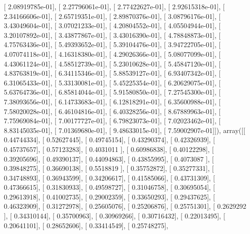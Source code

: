 \documentclass{article}
\begin{document}
       [  2.08919785e-01],
       [  2.27796061e-01],
       [  2.77422627e-01],
       [  2.92615318e-01],
       [  2.34166606e-01],
       [  2.65719351e-01],
       [  2.89870376e-01],
       [  3.08796176e-01],
       [  3.43049604e-01],
       [  3.07021233e-01],
       [  4.20804552e-01],
       [  4.05504944e-01],
       [  3.20107892e-01],
       [  3.43877867e-01],
       [  3.43016390e-01],
       [  4.78848873e-01],
       [  4.75763436e-01],
       [  5.49393652e-01],
       [  5.39104476e-01],
       [  3.94722705e-01],
       [  4.07074118e-01],
       [  4.16318380e-01],
       [  4.29026366e-01],
       [  5.08077099e-01],
       [  4.43061124e-01],
       [  4.58512739e-01],
       [  5.23010628e-01],
       [  5.45847120e-01],
       [  4.83763819e-01],
       [  6.34115346e-01],
       [  5.88539127e-01],
       [  6.93407342e-01],
       [  6.31065433e-01],
       [  5.33130081e-01],
       [  5.45225354e-01],
       [  6.20629075e-01],
       [  5.63764736e-01],
       [  6.85814044e-01],
       [  5.91580850e-01],
       [  7.27545300e-01],
       [  7.38093656e-01],
       [  6.14733683e-01],
       [  6.12818291e-01],
       [  6.35600988e-01],
       [  7.58020028e-01],
       [  6.46104816e-01],
       [  6.40328256e-01],
       [  8.67889963e-01],
       [  7.75969084e-01],
       [  7.00177727e-01],
       [  6.79823073e-01],
       [  7.02023462e-01],
       [  8.83145035e-01],
       [  7.01369680e-01],
       [  9.48633015e-01],
       [  7.59002907e-01]]), array([[ 0.44744334],
       [ 0.52627445],
       [ 0.49745154],
       [ 0.43290374],
       [ 0.42326939],
       [ 0.45737657],
       [ 0.57123283],
       [ 0.4031011 ],
       [ 0.60986838],
       [ 0.40122298],
       [ 0.39205696],
       [ 0.49390137],
       [ 0.44094863],
       [ 0.43855995],
       [ 0.4073087 ],
       [ 0.39848275],
       [ 0.36690138],
       [ 0.5518819 ],
       [ 0.35752872],
       [ 0.35277331],
       [ 0.34748893],
       [ 0.36943599],
       [ 0.34206617],
       [ 0.41585066],
       [ 0.43731309],
       [ 0.47366615],
       [ 0.31830933],
       [ 0.49598727],
       [ 0.31046758],
       [ 0.30695054],
       [ 0.29613918],
       [ 0.41002735],
       [ 0.29002359],
       [ 0.33650293],
       [ 0.29437625],
       [ 0.46323909],
       [ 0.31272978],
       [ 0.25605076],
       [ 0.25206876],
       [ 0.25751301],
       [ 0.2629292 ],
       [ 0.34310144],
       [ 0.35700963],
       [ 0.30969266],
       [ 0.30716432],
       [ 0.22013495],
       [ 0.20641101],
       [ 0.28652606],
       [ 0.33414549],
       [ 0.25748275],
\end{document}
